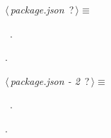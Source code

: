 	\begin{flushleft} \small
\begin{minipage}{\linewidth}\label{scrap4}\raggedright\small
{} $\langle\,${\itshape {package.json}}\nobreak\ {\footnotesize {?}}$\,\rangle\equiv$
\vspace{-1ex}
\begin{list}{}{} \item

                
        {\NWsep}
\end{list}
\vspace{-1.5ex}
\footnotesize
\begin{list}{}{\setlength{\itemsep}{-\parsep}\setlength{\itemindent}{-\leftmargin}}
\item \NWtxtMacroDefBy\ .
\item {\NWtxtMacroNoRef}.

\item{}
\end{list}
\end{minipage}\vspace{4ex}
\end{flushleft}
\begin{flushleft} \small
\begin{minipage}{\linewidth}\label{scrap5}\raggedright\small
{} $\langle\,${\itshape {package.json - 2}}\nobreak\ {\footnotesize {?}}$\,\rangle\equiv$
\vspace{-1ex}
\begin{list}{}{} \item

                
        {\NWsep}
\end{list}
\vspace{-1.5ex}
\footnotesize
\begin{list}{}{\setlength{\itemsep}{-\parsep}\setlength{\itemindent}{-\leftmargin}}
\item \NWtxtMacroDefBy\ .
\item {\NWtxtMacroNoRef}.

\item{}
\end{list}
\end{minipage}\vspace{4ex}
\end{flushleft}
